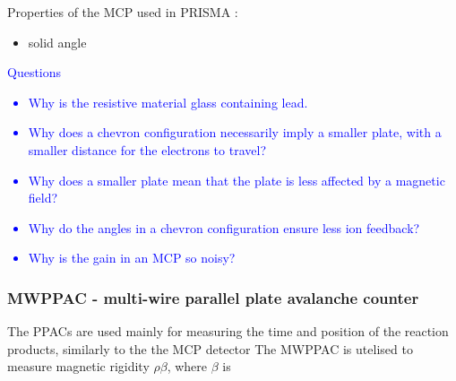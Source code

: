 \documentclass{article}
\begin{document}
Properties of the MCP used in PRISMA \cite{PRISMAFocalPlane}:\\
\begin{itemize}
    \item solid angle 
\end{itemize}
\textcolor{blue}
{Questions
\begin{itemize}
    \item Why is the resistive material glass containing lead.
    \item Why does a chevron configuration necessarily imply a smaller plate, with a smaller distance for the electrons to travel?
    \item Why does a smaller plate mean that the plate is less affected by a magnetic field?
    \item Why do the angles in a chevron configuration ensure less ion feedback?
    \item Why is the gain in an MCP so noisy?
\end{itemize}
}


\subsubsection{MWPPAC - multi-wire parallel plate avalanche counter}
The PPACs are used mainly for measuring the time and position of the reaction products, similarly to the the MCP detector 
The MWPPAC is utelised to measure magnetic rigidity $\rho \beta$, where $\beta$ is 
\end{document}
